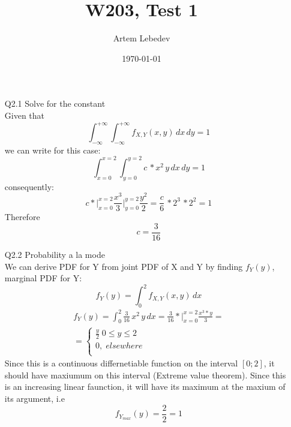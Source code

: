 \documentclass{article}
\author{Artem Lebedev}
\title{W203, Test 1}
\date{\today}
\begin{document}
\maketitle

\begin{enumerate}
\item[Q2.1] Solve for the constant\\
	Given that
	\begin{equation}
		\int_{-\infty}^{+\infty} \int_{-\infty}^{+\infty}f_{X,Y}(x,y) \,dx\,dy = 1
	\end{equation}
	we can write for this case:
	\begin{equation}
		\int_{x=0}^{x=2} \int_{y=0}^{y=2}c\,*x^2\,y \,dx\,dy = 1
	\end{equation}
	consequently:
	\begin{equation}
		c*\Big|_{x=0}^{x=2} \frac{x^3}{3}\Big|_{y=0}^{y=2}\frac{y^2}{2} = 
		\frac{c}{6}\,*2^3\,*2^2 = 1
	\end{equation}
	Therefore $$c = \frac{3}{16}$$
\item[Q2.2] Probability a la mode\\
	We can derive PDF for Y from joint PDF of X and Y by finding $f_Y(y)$, marginal PDF for Y:
	\begin{equation}
		f_Y(y) = \int_{0}^{2}f_{X,Y}(x,y)\,dx
	\end{equation}
	\begin{align*}
		f_Y(y) = \int_{0}^{2}\frac{3}{16}\,x^2\,y\,dx=\frac{3}{16}*\Big|_{x=0}^{x=2}\frac{x^3*y}{3}=\\
		= 	\begin{cases}
				\frac{y}{2}\;0\leq y \leq2\\
				0,\; elsewhere\\
			\end{cases}
	\end{align*}
	Since this is a continuous differnetiable function on the interval $[0;2]$, it should have maxiumum on this interval (Extreme value theorem). Since this is an increasing linear faunction, it will have its maximum at the maxium of its argument, i.e $$f_{Y_{max}}(y) = \frac{2}{2} = 1$$
	
\end{enumerate}
\end{document}
